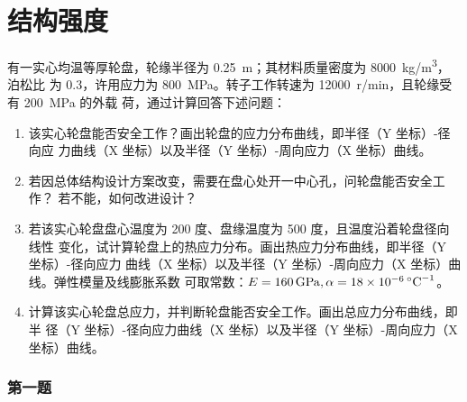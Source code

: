 
\part{结构强度}

\begin{tcolorbox}
    有一实心均温等厚轮盘，轮缘半径为 \qty{0.25}{\meter}；其材料质量密度为 \qty{8000}{kg/m^3}，泊松比
为 0.3，许用应力为 \qty{800}{MPa}。转子工作转速为 \qty{12000}{r/min}，且轮缘受有 \qty{200}{MPa} 的外载
荷，通过计算回答下述问题：
    \begin{enumerate}
        \item 该实心轮盘能否安全工作？画出轮盘的应力分布曲线，即半径（Y 坐标）-径向应
        力曲线（X 坐标）以及半径（Y 坐标）-周向应力（X 坐标）曲线。
        \item 若因总体结构设计方案改变，需要在盘心处开一中心孔，问轮盘能否安全工作？
        若不能，如何改进设计？
        \item 若该实心轮盘盘心温度为 200 度、盘缘温度为 500 度，且温度沿着轮盘径向线性
        变化，试计算轮盘上的热应力分布。画出热应力分布曲线，即半径（Y 坐标）-径向应力
        曲线（X 坐标）以及半径（Y 坐标）-周向应力（X 坐标）曲线。弹性模量及线膨胀系数
        可取常数：$E=\qty{160}{GPa}, \alpha=\qty{18e{-6}}{\degreeCelsius^{-1}}$。
        \item 计算该实心轮盘总应力，并判断轮盘能否安全工作。画出总应力分布曲线，即半
        径（Y 坐标）-径向应力曲线（X 坐标）以及半径（Y 坐标）-周向应力（X 坐标）曲线。
    \end{enumerate}
\end{tcolorbox}

\section{第一题}


